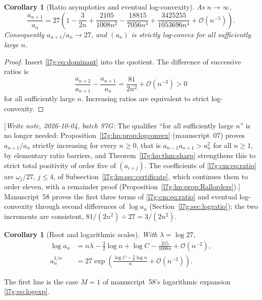 \documentclass[11pt,letterpaper]{article}
\newtheorem{corollary}[theorem]{Corollary}
\theoremstyle{remark}\newtheorem{remark}[theorem]{Remark}
\newcommand{\bigO}{\mathcal O}\newcommand{\Ct}{C_{t}}
\newcommand{\hpnote}[1]{\textup{[}\emph{Write note, 2026-10-04, batch 97G:} #1\textup{]}}
\newcounter{l7gtrsavedeq}
\begin{document}
\begin{corollary}[Ratio asymptotics and eventual log-convexity]\label{l7g:cm:cor:ratio}
As $n\to\infty$,
\begin{equation}\label{l7g:cm:eq:ratio}
 \frac{a_{n+1}}{a_n}
 =27\left(
 1-\frac{3}{2n}
 +\frac{2105}{1008n^2}
 -\frac{18815}{7056n^3}
 +\frac{3425255}{1053696n^4}
 +\bigO(n^{-5})\right).
\end{equation}
Consequently $a_{n+1}/a_n\to27$, and $(a_n)$ is strictly log-convex for
all sufficiently large $n$.
\end{corollary}
\begin{proof}
Insert \eqref{l7g:eq:dominant} into the quotient. The difference of
successive ratios is
\[
 \frac{a_{n+2}}{a_{n+1}}-\frac{a_{n+1}}{a_n}
 =\frac{81}{2n^2}+\bigO(n^{-3})>0
\]
for all sufficiently large $n$. Increasing ratios are equivalent to
strict log-convexity.
\end{proof}
\hpnote{The qualifier ``for all sufficiently large $n$'' is no longer
needed: Proposition~\ref{l7g:hp:prop:logconvex} (manuscript~07) proves
$a_{n+1}/a_n$ strictly increasing for every $n\ge0$, that is
$a_{n-1}a_{n+1}>a_n^2$ for all $n\ge1$, by elementary ratio barriers, and
Theorem~\ref{l7g:hp:thm:sharp} strengthens this to strict total positivity
of order five of $(a_{i+j})$. The coefficients of \eqref{l7g:cm:eq:ratio}
are $\omega_j/27$, $j\le4$, of Subsection~\ref{l7g:hp:sec:certificate},
which continues them to order eleven, with a remainder proof
(Proposition~\ref{l7g:hp:prop:Rallorders}).}
Manuscript~58 proves the first three terms of \eqref{l7g:cm:eq:ratio} and
eventual log-convexity through second differences of $\log a_n$
(Section~\ref{l7g:sec:logratio}); the two increments are consistent,
$81/(2n^2)\div27=3/(2n^2)$.

\begin{corollary}[Root and logarithmic scales]\label{l7g:cm:cor:root}
With $\lambda=\log 27$,
\begin{align}
 \log a_n
 &=n\lambda-\frac32\log n+\log C
   -\frac{215}{1008n}+\bigO(n^{-2}),\label{l7g:cm:eq:log-asymp}\\
 a_n^{1/n}
 &=27\exp\!\left(
   \frac{\log C-\frac32\log n}{n}+\bigO(n^{-2})\right).\label{l7g:cm:eq:root}
\end{align}
\end{corollary}
The first line is the case $M=1$ of manuscript~58's logarithmic expansion
\eqref{l7g:eq:logexp}.
\end{document}

